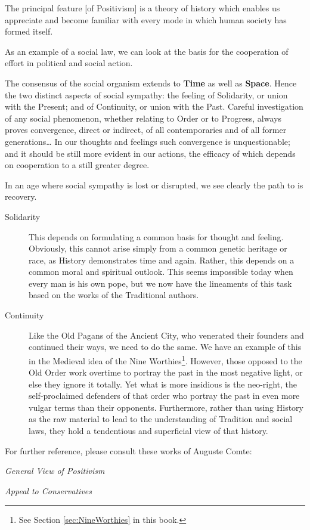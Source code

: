 \begin{quotex}
The principal feature [of Positivism] is a theory of history which enables us appreciate and become familiar with every mode in which human society has formed itself.

\end{quotex}
As an example of a social law, we can look at the basis for the cooperation of effort in political and social action.

\begin{quotex}
The consensus of the social organism extends to \textbf{Time} as well as \textbf{Space}. Hence the two distinct aspects of social sympathy: the feeling of Solidarity, or union with the Present; and of Continuity, or union with the Past. Careful investigation of any social phenomenon, whether relating to Order or to Progress, always proves convergence, direct or indirect, of all contemporaries and of all former generations… In our thoughts and feelings such convergence is unquestionable; and it should be still more evident in our actions, the efficacy of which depends on cooperation to a still greater degree.

\end{quotex}
In an age where social sympathy is lost or disrupted, we see clearly the path to is recovery.

\begin{description}
\item[Solidarity ]

This depends on formulating a common basis for thought and feeling. Obviously, this cannot arise simply from a common genetic heritage or race, as History demonstrates time and again. Rather, this depends on a common moral and spiritual outlook. This seems impossible today when every man is his own pope, but we now have the lineaments of this task based on the works of the Traditional authors. 

\item[Continuity ]

Like the Old Pagans of the Ancient City, who venerated their founders and continued their ways, we need to do the same. We have an example of this in the Medieval idea of the Nine Worthies\footnote{See Section \ref{sec:NineWorthies} in this book.}. However, those opposed to the Old Order work overtime to portray the past in the most negative light, or else they ignore it totally. Yet what is more insidious is the neo-right, the self-proclaimed defenders of that order who portray the past in even more vulgar terms than their opponents. Furthermore, rather than using History as the raw material to lead to the understanding of Tradition and social laws, they hold a tendentious and superficial view of that history. 

\end{description}
For further reference, please consult these works of Auguste Comte:

\textit{General View of Positivism}

\textit{Appeal to Conservatives}



